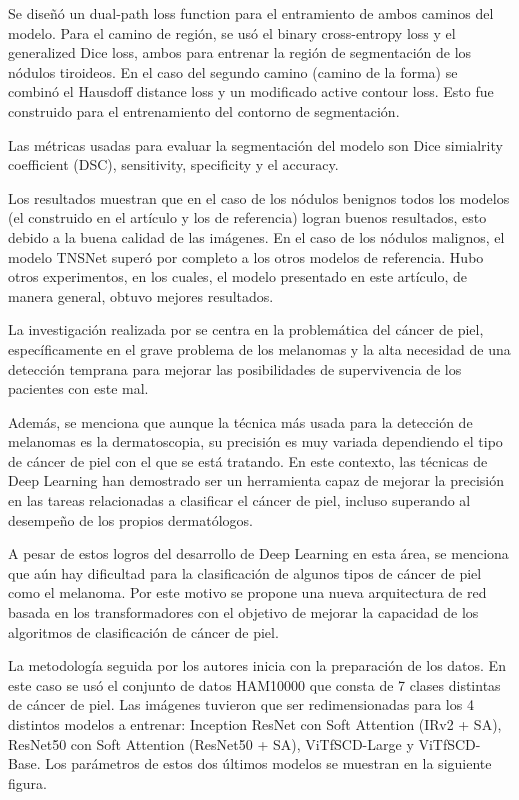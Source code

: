 Se diseñó un dual-path loss function para el entramiento de ambos caminos del modelo. Para el camino de región, se usó el binary cross-entropy loss y el generalized Dice loss, ambos para entrenar la región de segmentación de los nódulos tiroideos. En el caso del segundo camino (camino de la forma) se combinó el Hausdoff distance loss y un modificado active contour loss. Esto fue construido para el entrenamiento del contorno de segmentación.

Las métricas usadas para evaluar la segmentación del modelo son Dice simialrity coefficient (DSC), sensitivity, specificity y el accuracy.

Los resultados muestran que en el caso de los nódulos benignos todos los modelos (el construido en el artículo y los de referencia) logran buenos resultados, esto debido a la buena calidad de las imágenes. En el caso de los nódulos malignos, el modelo TNSNet superó por completo a los otros modelos de referencia. Hubo otros experimentos, en los cuales, el modelo presentado en este artículo, de manera general, obtuvo mejores resultados.

La investigación realizada por \cite{pr_yang2023novelViTscc} se centra en la problemática del cáncer de piel, específicamente en el grave problema de los melanomas y la alta necesidad de una detección temprana para mejorar las posibilidades de supervivencia de los pacientes con este mal.

Además, se menciona que aunque la técnica más usada para la detección de melanomas es la dermatoscopia, su precisión es muy variada dependiendo el tipo de cáncer de piel con el que se está tratando. En este contexto, las técnicas de Deep Learning han demostrado ser un herramienta capaz de mejorar la precisión en las tareas relacionadas a clasificar el cáncer de piel, incluso superando al desempeño de los propios dermatólogos.

A pesar de estos logros del desarrollo de Deep Learning en esta área, se menciona que aún hay dificultad para la clasificación de algunos tipos de cáncer de piel como el melanoma. Por este motivo se propone una nueva arquitectura de red basada en los transformadores con el objetivo de mejorar la capacidad de los algoritmos de clasificación de cáncer de piel.

La metodología seguida por los autores inicia con la preparación de los datos. En este caso se usó el conjunto de datos HAM10000 que consta de 7 clases distintas de cáncer de piel. Las imágenes tuvieron que ser redimensionadas para los 4 distintos modelos a entrenar: Inception ResNet con Soft Attention (IRv2 + SA), ResNet50 con Soft Attention (ResNet50 + SA), ViTfSCD-Large y ViTfSCD-Base. Los parámetros de estos dos últimos modelos se muestran en la siguiente figura.

